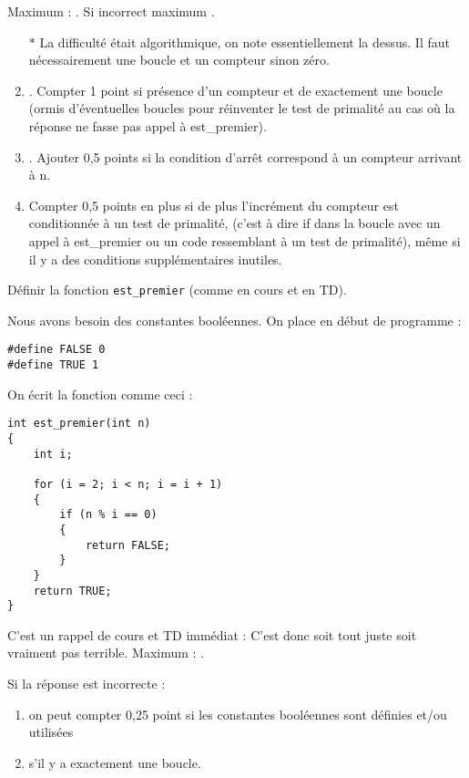 \begin{baremeenv}
  Maximum : .  Si incorrect maximum .
\begin{enumerate}[ (a)]
\item[$\ast$]  La difficulté
  était algorithmique, on note essentiellement la dessus. Il faut
  nécessairement une boucle et un compteur sinon zéro.
\item {}. Compter 1 point si présence d'un compteur et de
  exactement une boucle (ormis d'éventuelles
  boucles pour réinventer le test de primalité au cas où la réponse ne
  fasse pas appel à est\_premier). 
\item {}. Ajouter 0,5 points si la condition d'arrêt
  correspond à un compteur arrivant à n. 
\item {} Compter 0,5 points en plus
  si de plus l'incrément du compteur est conditionnée à un test de primalité,
  (c'est à dire if dans la boucle avec un appel à est\_premier ou un
  code ressemblant à un test de primalité), même si il y a des
  conditions supplémentaires inutiles.
\end{enumerate}
\end{baremeenv}

\question Définir la fonction \verb+est_premier+ (comme en cours et en
TD).

\begin{correction}
Nous avons besoin des constantes booléennes. On place en début de
programme :
 \begin{small}
\begin{verbatim}
#define FALSE 0
#define TRUE 1
\end{verbatim}
  \end{small}

On écrit la fonction comme ceci :
  \begin{small}
\begin{verbatim}
int est_premier(int n)
{
    int i;

    for (i = 2; i < n; i = i + 1)
    {   
        if (n % i == 0) 
        {
            return FALSE; 
        }
    }
    return TRUE;
}
\end{verbatim}
  \end{small}
\end{correction}

\begin{baremeenv}
  C'est un rappel de cours et TD immédiat : C'est donc soit tout juste
  soit vraiment pas terrible. Maximum : .

Si la réponse est incorrecte :
  \begin{enumerate}[ (a)]
  \item {}
    on peut compter 0,25 point
    si les constantes booléennes sont définies et/ou utilisées 
\item {} s'il y a exactement une boucle.
 \end{enumerate}
\end{baremeenv}


